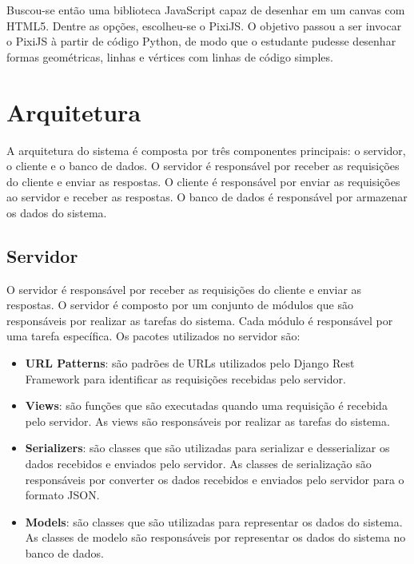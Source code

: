Buscou-se então uma biblioteca JavaScript capaz de desenhar em um canvas com HTML5. Dentre as opções, escolheu-se o PixiJS. O objetivo passou a ser invocar o PixiJS à partir de código Python, de modo que o estudante pudesse desenhar formas geométricas, linhas e vértices com linhas de código simples.

\section{Arquitetura}

A arquitetura do sistema é composta por três componentes principais: o servidor, o cliente e o banco de dados. O servidor é responsável por receber as requisições do cliente e enviar as respostas. O cliente é responsável por enviar as requisições ao servidor e receber as respostas. O banco de dados é responsável por armazenar os dados do sistema.

\subsection{Servidor}

O servidor é responsável por receber as requisições do cliente e enviar as respostas. O servidor é composto por um conjunto de módulos que são responsáveis por realizar as tarefas do sistema. Cada módulo é responsável por uma tarefa específica. Os pacotes utilizados no servidor são:

\begin{itemize}
    \item \textbf{URL Patterns}: são padrões de URLs utilizados pelo Django Rest Framework para identificar as requisições recebidas pelo servidor.
    \item \textbf{Views}: são funções que são executadas quando uma requisição é recebida pelo servidor. As views são responsáveis por realizar as tarefas do sistema.
    \item \textbf{Serializers}: são classes que são utilizadas para serializar e desserializar os dados recebidos e enviados pelo servidor. As classes de serialização são responsáveis por converter os dados recebidos e enviados pelo servidor para o formato JSON.
    \item \textbf{Models}: são classes que são utilizadas para representar os dados do sistema. As classes de modelo são responsáveis por representar os dados do sistema no banco de dados.
\end{itemize}

